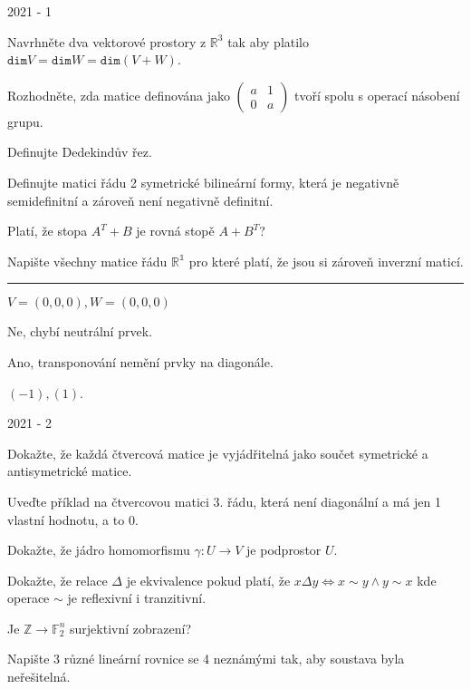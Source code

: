 \newpage
{\large 2021 - 1}

\begin{questions}

\question Navrhněte dva vektorové prostory z \(\mathbb{R}^3\) tak aby platilo \(\texttt{dim} V = \texttt{dim} W = \texttt{dim}(V + W)\).

\question Rozhodněte, zda matice definována jako \(\begin{pmatrix}
    a & 1\\
    0 & a
\end{pmatrix}\) tvoří spolu s operací násobení grupu.

\question Definujte Dedekindův řez.

\question Definujte matici řádu 2 symetrické bilineární formy, která je negativně semidefinitní a zároveň není negativně definitní.

\question Platí, že stopa \(A^T + B\) je rovná stopě \(A + B^T\)?

\question Napište všechny matice řádu \(\mathbb{R^1}\) pro které platí, že jsou si zároveň inverzní maticí.

\end{questions}

\hrule

\begin{questions}

{\color{gray}

\question \(V = (0,0,0), W = (0,0,0)\)

\question Ne, chybí neutrální prvek.

\question

\question

\question Ano, transponování nemění prvky na diagonále.

\question \((-1), (1)\).

}

\end{questions}

\newpage
{\large 2021 - 2}

\begin{questions}

\question Dokažte, že každá čtvercová matice je vyjádřitelná jako součet symetrické a antisymetrické matice.

\question Uveďte příklad na čtvercovou matici 3. řádu, která není diagonální a má jen 1 vlastní hodnotu, a to 0.

\question Dokažte, že jádro homomorfismu \(\gamma: U \rightarrow V\) je podprostor \(U\).

\question Dokažte, že relace \(\Delta\) je ekvivalence pokud platí, že \(x \Delta y \Leftrightarrow x \sim y \wedge y \sim x\) kde operace \(\sim\) je reflexivní i tranzitivní.

\question Je \(\mathbb{Z} \rightarrow \mathbb{F}_2^n\) surjektivní zobrazení?

\question Napište 3 různé lineární rovnice se 4 neznámými tak, aby soustava byla neřešitelná.

\end{questions}

